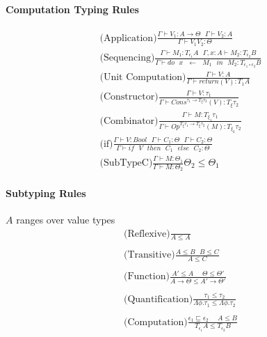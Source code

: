 \documentclass[twoside,a4paper,11pt]{article}
\newcommand{\s}{\mbox{ }}
\newcommand{\subtype}{\leq}
\newcommand{\subeffect}{\sqsubseteq}
\newcommand{\typeJudgement}[2]{\Gamma\vdash #1 \colon #2}
\newcommand{\modVarTypeJudgement}[3]{\Gamma, #1 \vdash #2 \colon #3}
\newcommand{\conditionalrule}[4]{\syntaxRule{#1}{#2}{#3} #4}
\newcommand{\syntaxRule}[3]{\displaystyle\mbox{#1}\frac{#2}{#3}}
\begin{document}
\paragraph{Computation Typing Rules}

\[\begin{array}{c}
\syntaxRule{(Application)}{\typeJudgement{V_1}{A \rightarrow \Theta}\s\typeJudgement{V_2}{A}}{\typeJudgement{V_1 V_2}{\Theta}}
\\
\syntaxRule{(Sequencing)}{\typeJudgement{M_1}{T_{\epsilon_1} A}\s\modVarTypeJudgement{x: A}{M_2}{T_{\epsilon_2} B}}{\typeJudgement{do \s x \s \leftarrow \s M_1 \s in \s M_2}{T_{\epsilon_1 \circ \epsilon_2} B}}
\\
\syntaxRule{(Unit Computation)}{\typeJudgement{V}{A}}{\typeJudgement{return(V)}{T_{1}A}}
\\
\syntaxRule{(Constructor)}{\typeJudgement{V}{\tau_1}}{\typeJudgement{ Cons^{\tau_1 \rightarrow T_{\xi} \tau_2}(V)}{T_{\xi} \tau_2}}
\\
\syntaxRule{(Combinator)}{\typeJudgement{M}{{T_{\xi_1} \tau_1}}}{\typeJudgement{ Op^{T_{\xi} \tau_1 \rightarrow T_{\xi} \tau_2}(M)}{{T_{\xi_2} \tau_2}}}
\\
\syntaxRule{(if)}{\typeJudgement{V}{Bool}\s\typeJudgement{C_1}{\Theta}\s\typeJudgement{C_2}{\Theta}}{\typeJudgement{if\s V\s then\s C_1\s else \s C_2}{\Theta}}
\\
\conditionalrule{(SubTypeC)}{\typeJudgement{M}{\Theta_1}}{\typeJudgement{M}{\Theta_2}}{\Theta_2 \subtype \Theta_1}
\end{array}\]

\paragraph{Subtyping Rules}

$A$ ranges over value types
\[\begin{array}{c}

\syntaxRule{(Reflexive)}{}{A \subtype A}
\\
\\
\syntaxRule{(Transitive)}{A \subtype B\s B\subtype C}{A \subtype C}
\\
\\
\syntaxRule{(Function)}{A' \subtype A \s\s \Theta\subtype \Theta'}{A \rightarrow \Theta \subtype A' \rightarrow \Theta'}
\\
\\
\syntaxRule{(Quantification)}{\tau_1 \subtype \tau_2}{\Lambda \phi. \tau_1 \subtype \Lambda \phi. \tau_2}
\\
\\
\syntaxRule{(Computation)}{\epsilon_1 \subeffect \epsilon_2\s\s A \subtype B}{T_{\epsilon_1} A \subtype T_{\epsilon_2} B}

\end{array}\]
\end{document}
